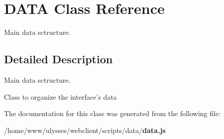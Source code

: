 \section{DATA Class Reference}
\label{classDATA}
Main data sctructure.  




\subsection{Detailed Description}
Main data sctructure. 

Class to organize the interface's data 

The documentation for this class was generated from the following file:\begin{CompactItemize}
\item 
/home/www/ulysses/webclient/scripts/data/{\bf data.js}\end{CompactItemize}
